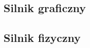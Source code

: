 \subsection{Silnik graficzny}\label{sub:silnik graficzny}

\subsection{Silnik fizyczny}\label{sub:silnik fizyczny}

